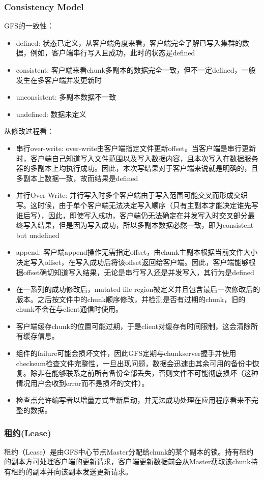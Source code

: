 \documentclass{ctexart}
\begin{document}
\subsubsection{Consistency Model}
GFS的一致性：
\begin{itemize}
	\item defined: 状态已定义，从客户端角度来看，客户端完全了解已写入集群的数据，例如，客户端串行写入且成功，此时的状态是defined
	\item consistent: 客户端来看chunk多副本的数据完全一致，但不一定defined，一般发生在多客户端并发更新时
	\item unconsistent: 多副本数据不一致
	\item undefined: 数据未定义
\end{itemize}
从修改过程看：
\begin{itemize}
	\item 串行over-write: over-write由客户端指定文件更新offset。当客户端是串行更新时，客户端自己知道写入文件范围以及写入数据内容，且本次写入在数据服务器的多副本上均执行成功。因此，本次写结果对于客户端来说就是明确的，且多副本上数据一致，故而结果是defined
	\item 并行Over-Write: 并行写入时多个客户端由于写入范围可能交叉而形成交织写。这时候，由于单个客户端无法决定写入顺序（只有主副本才能决定谁先写谁后写），因此，即使写入成功，客户端仍无法确定在并发写入时交叉部分最终写入结果，但是因为写入成功，所以多副本数据必然一致，即为consistent but undefined
	\item append: 客户端append操作无需指定offset，由chunk主副本根据当前文件大小决定写入offset，在写入成功后将该offset返回给客户端。因此，客户端能够根据offset确切知道写入结果，无论是串行写入还是并发写入，其行为是defined
	\item 在一系列的成功修改后，mutated file region被定义并且包含最后一次修改后的版本。之后按文件中的chunk顺序修改，并检测是否有过期的chunk，旧的chunk不会在与client通信时使用。
	\item 客户端缓存chunk的位置可能过期，于是client对缓存有时间限制，这会清除所有缓存信息。
	\item 组件的failure可能会损坏文件，因此GFS定期与chunkserver握手并使用checksum检查文件完整性，一旦出现问题，数据会迅速由其余可用的备份中恢复。除非在能够联系之前所有备份全部丢失，否则文件不可能彻底损坏（这种情况用户会收到error而不是损坏的文件）。
	\item 检查点允许编写者以增量方式重新启动，并无法成功处理在应用程序看来不完整的数据。
\end{itemize}
\subsubsection{租约(Lease)}
租约（Lease）是由GFS中心节点Master分配给chunk的某个副本的锁。持有租约的副本方可处理客户端的更新请求，客户端更新数据前会从Master获取该chunk持有租约的副本并向该副本发送更新请求。
\end{document}
